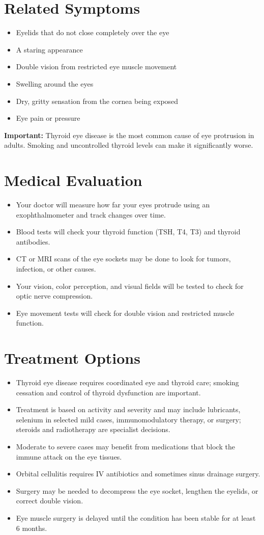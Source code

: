 \section*{Related Symptoms}
\begin{itemize}
  \item Eyelids that do not close completely over the eye
  \item A staring appearance
  \item Double vision from restricted eye muscle movement
  \item Swelling around the eyes
  \item Dry, gritty sensation from the cornea being exposed
  \item Eye pain or pressure
\end{itemize}
\textbf{Important:} Thyroid eye disease is the most common cause of eye protrusion in adults. Smoking and uncontrolled thyroid levels can make it significantly worse.

\section*{Medical Evaluation}
\begin{itemize}
  \item Your doctor will measure how far your eyes protrude using an exophthalmometer and track changes over time.
  \item Blood tests will check your thyroid function (TSH, T4, T3) and thyroid antibodies.
  \item CT or MRI scans of the eye sockets may be done to look for tumors, infection, or other causes.
  \item Your vision, color perception, and visual fields will be tested to check for optic nerve compression.
  \item Eye movement tests will check for double vision and restricted muscle function.
\end{itemize}

\section*{Treatment Options}
\begin{itemize}
  \item Thyroid eye disease requires coordinated eye and thyroid care; smoking cessation and control of thyroid dysfunction are important.
  \item Treatment is based on activity and severity and may include lubricants, selenium in selected mild cases, immunomodulatory therapy, or surgery; steroids and radiotherapy are specialist decisions.
  \item Moderate to severe cases may benefit from medications that block the immune attack on the eye tissues.
  \item Orbital cellulitis requires IV antibiotics and sometimes sinus drainage surgery.
  \item Surgery may be needed to decompress the eye socket, lengthen the eyelids, or correct double vision.
  \item Eye muscle surgery is delayed until the condition has been stable for at least 6 months.
\end{itemize}

